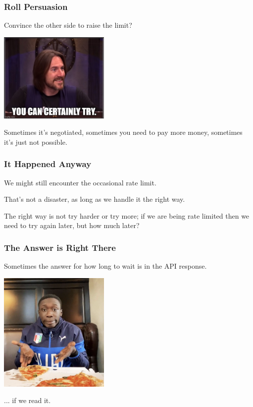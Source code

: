 \begin{frame}
\frametitle{Roll Persuasion}

Convince the other side to raise the limit?

\begin{center}
  \includegraphics[width=0.4\textwidth]{images/certainly-try.jpg}
\end{center}

Sometimes it's negotiated, sometimes you need to pay more money, sometimes it's just not possible.

\end{frame}

\begin{frame}
\frametitle{It Happened Anyway}

We might still encounter the occasional rate limit. 

That's not a disaster, as long as we handle it the right way. 

The right way is not try harder or try more; if we are being rate limited then we need to try again later, but how much later?

\end{frame}

\begin{frame}
\frametitle{The Answer is Right There}

Sometimes the answer for how long to wait is in the API response.

\begin{center}
  \includegraphics[width=0.4\textwidth]{images/khaby.png}
\end{center}

... if we read it.

\end{frame}

